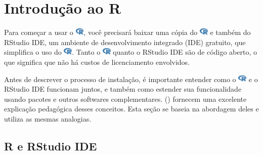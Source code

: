 \documentclass[
  letterpaper,
]{book}
\theoremstyle{definition}
\theoremstyle{plain}
\theoremstyle{remark}
\begin{document}
\cleardoublepage
{}
{}
\appendix

\chapter{Introdução ao R}\label{introduuxe7uxe3o-ao-r}

Para começar a usar o
\includegraphics[width=1.13em,height=1em]{getting_started_with_r_files/figure-pdf/fa-icon-9b00320707d42527dde67262afb33ded.pdf},
você precisará baixar uma cópia do
\includegraphics[width=1.13em,height=1em]{getting_started_with_r_files/figure-pdf/fa-icon-9b00320707d42527dde67262afb33ded.pdf}
e também do RStudio IDE, um ambiente de desenvolvimento integrado (IDE)
gratuito, que simplifica o uso do
\includegraphics[width=1.13em,height=1em]{getting_started_with_r_files/figure-pdf/fa-icon-9b00320707d42527dde67262afb33ded.pdf}.
Tanto o
\includegraphics[width=1.13em,height=1em]{getting_started_with_r_files/figure-pdf/fa-icon-9b00320707d42527dde67262afb33ded.pdf}
quanto o RStudio IDE são de código aberto, o que significa que não há
custos de licenciamento envolvidos.

Antes de descrever o processo de instalação, é importante entender como
o
\includegraphics[width=1.13em,height=1em]{getting_started_with_r_files/figure-pdf/fa-icon-9b00320707d42527dde67262afb33ded.pdf}
e o RStudio IDE funcionam juntos, e também como estender sua
funcionalidade usando pacotes e outros softwares complementares.
()
fornecem uma excelente explicação pedagógica desses conceitos. Esta
seção se baseia na abordagem deles e utiliza as mesmas analogias.

\section{R e RStudio IDE}\label{r-e-rstudio-ide}
\end{document}
